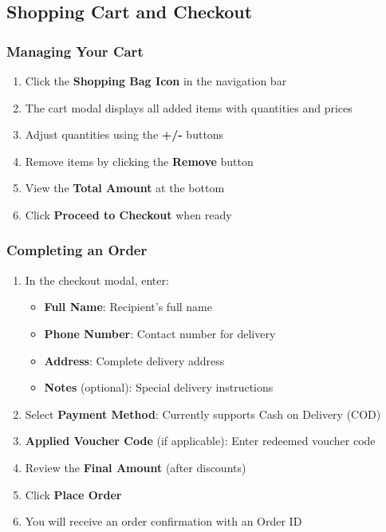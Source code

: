 \documentclass[12pt, a4paper]{report}
\begin{document}
{{\subsection{Shopping Cart and Checkout}

\subsubsection{Managing Your Cart}

\begin{enumerate}
    \item Click the \textbf{Shopping Bag Icon} in the navigation bar
    \item The cart modal displays all added items with quantities and prices
    \item Adjust quantities using the \textbf{+/-} buttons
    \item Remove items by clicking the \textbf{Remove} button
    \item View the \textbf{Total Amount} at the bottom
    \item Click \textbf{Proceed to Checkout} when ready
\end{enumerate}

\subsubsection{Completing an Order}

\begin{enumerate}
    \item In the checkout modal, enter:
    \begin{itemize}
        \item \textbf{Full Name}: Recipient's full name
        \item \textbf{Phone Number}: Contact number for delivery
        \item \textbf{Address}: Complete delivery address
        \item \textbf{Notes} (optional): Special delivery instructions
    \end{itemize}
    \item Select \textbf{Payment Method}: Currently supports Cash on Delivery (COD)
    \item \textbf{Applied Voucher Code} (if applicable): Enter redeemed voucher code
    \item Review the \textbf{Final Amount} (after discounts)
    \item Click \textbf{Place Order}
    \item You will receive an order confirmation with an Order ID
\end{enumerate}

}}
\end{document}
